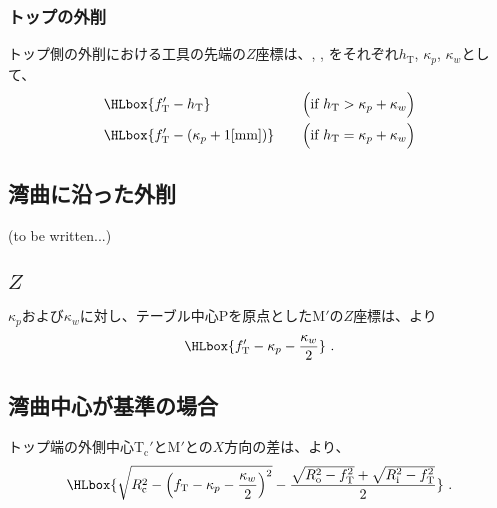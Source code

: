 \subsubsection{トップの外削}
トップ側の外削における工具の先端の$Z$座標は、\TopOutcutLength, \KeywayPos, \KeywayWidth をそれぞれ$h_\mathrm T$, $\kappa_p$, $\kappa_w$として、
\begin{alignat*}{3}
  & \HLbox{f_\mathrm T'-h_\mathrm T} & \quad & \Big(\text{if}~h_\mathrm T > \kappa_p+\kappa_w\Big)\\
  & \HLbox{f_\mathrm T'-\left(\kappa_p+1[\mathrm{mm}]\right)} & \quad  & \Big(\text{if}~h_\mathrm T = \kappa_p+\kappa_w\Big)
\end{alignat*}


\subsection{湾曲に沿った外削\TBW}
(to be written...)



\clearpage


\subsection{\KeywayCenter\texorpdfstring{$Z$}{Z}}
\KeywayPos$\kappa_p$および\KeywayWidth$\kappa_w$に対し、テーブル中心Pを原点とした\KeywayCenter M$'$の$Z$座標は、より
\begin{align*}
  \HLbox{f_\mathrm T'-\kappa_p-\frac{\kappa_w}2}\ .
\end{align*}


\subsection{湾曲中心が基準の場合}
トップ端の外側中心T$_\mathrm c'$と\KeywayCenter M$'$との$X$方向の差は、より、
\begin{align*}
  \HLbox{%
    \sqrt{R_\mathrm c^2-\left(f_\mathrm T-\kappa_p-\frac{\kappa_w}2\right)^2}
    -\frac{\sqrt{R_\mathrm o^2-f_\mathrm T^2}+\sqrt{R_\mathrm i^2-f_\mathrm T^2}}2%
  }\ .
\end{align*}


